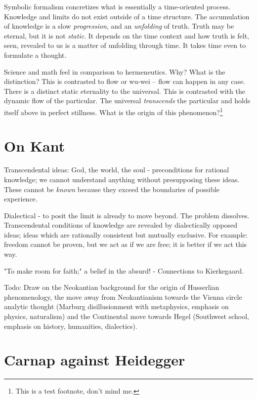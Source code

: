 \documentclass[leqno]{article}
\begin{document}
	Symbolic formalism concretizes what is essentially a time-oriented process.
	Knowledge and limits do not exist outside of a time structure. The accumulation
	of knowledge is a slow \emph{progression}, and an \emph{unfolding} of truth. Truth
	may be eternal, but it is not \emph{static}. It depends on the time context
	and how truth is felt, seen, revealed to us is a matter of unfolding through
	time. It takes time even to formulate a thought.

	Science and math feel  in comparison to hermeneutics. Why?
	What is the distinction? This is contrasted to flow or wu-wei -- flow can
	happen in any case. There is a distinct static eternality to the universal.
	This is contrasted with the dynamic flow of the particular. The universal \emph{transcends}
	the particular and holds itself above in perfect stillness. What is the origin
	of this phenomenon?\footnote{This is a test footnote, don't mind me.}

	\section{On Kant}

	Transcendental ideas: God, the world, the soul - preconditions for rational
	knowledge; we cannot understand anything without presupposing these ideas.
	These cannot be \emph{known} because they exceed the boundaries of possible experience.

	Dialectical - to posit the limit is already to move beyond. The problem
	dissolves. Transcendental conditions of knowledge are revealed by dialectically
	opposed ideas; ideas which are rationally consistent but mutually exclusive. For
	example: freedom cannot be proven, but we act as if we are free; it is better
	if we act this way.

	"To make room for faith;" a belief in the absurd! - Connections to Kierkegaard.

	Todo: Draw on the Neokantian background for the origin of Husserlian phenomenology,
	the move away from Neokantianism towards the Vienna circle analytic thought (Marburg
	disillusionment with metaphysics, emphasis on physics, naturalism) and the
	Continental move towards Hegel (Southwest school, emphasis on history, humanities,
	dialectics).

	\section{Carnap against Heidegger}
\end{document}
